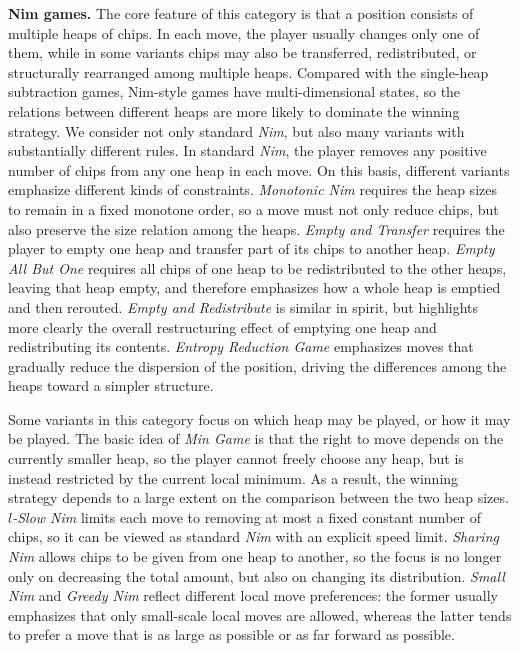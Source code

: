 \documentclass[review]{elsarticle}
\begin{document}
{\color{red}\textbf{Nim games.} The core feature of this category is that a position consists of multiple heaps of chips. In each move, the player usually changes only one of them, while in some variants chips may also be transferred, redistributed, or structurally rearranged among multiple heaps. 
Compared with the single-heap subtraction games, Nim-style games have multi-dimensional states, so the relations between different heaps are more likely to dominate the winning strategy. 
We consider not only standard \emph{Nim}, but also many variants with substantially different rules. 
In standard \emph{Nim}, the player removes any positive number of chips from any one heap in each move. On this basis, different variants emphasize different kinds of constraints.
\emph{Monotonic Nim} requires the heap sizes to remain in a fixed monotone order, so a move must not only reduce chips, but also preserve the size relation among the heaps.
\emph{Empty and Transfer} requires the player to empty one heap and transfer part of its chips to another heap. 
\emph{Empty All But One} requires all chips of one heap to be redistributed to the other heaps, leaving that heap empty, and therefore emphasizes how a whole heap is emptied and then rerouted. \emph{Empty and Redistribute} is similar in spirit, but highlights more clearly the overall restructuring effect of emptying one heap and redistributing its contents. 
\emph{Entropy Reduction Game} emphasizes moves that gradually reduce the dispersion of the position, driving the differences among the heaps toward a simpler structure. 

Some variants in this category focus on which heap may be played, or how it may be played. 
The basic idea of \emph{Min Game} is that the right to move depends on the currently smaller heap, so the player cannot freely choose any heap, but is instead restricted by the current local minimum. 
As a result, the winning strategy depends to a large extent on the comparison between the two heap sizes. 
\emph{$l$-Slow Nim} limits each move to removing at most a fixed constant number of chips, so it can be viewed as standard \emph{Nim} with an explicit speed limit. 
\emph{Sharing Nim} allows chips to be given from one heap to another, so the focus is no longer only on decreasing the total amount, but also on changing its distribution. 
\emph{Small Nim} and \emph{Greedy Nim} reflect different local move preferences: the former usually emphasizes that only small-scale local moves are allowed, whereas the latter tends to prefer a move that is as large as possible or as far forward as possible.

}
\end{document}
